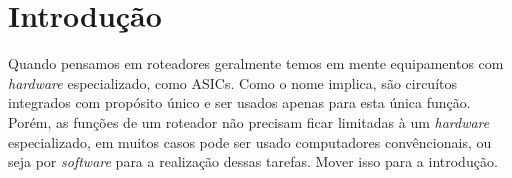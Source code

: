 \section{Introdução}

Quando pensamos em roteadores geralmente temos em mente equipamentos com \textit{hardware} especializado, como \acp{ASIC}. Como o nome implica, são circuítos integrados com propósito único e ser usados apenas para esta única função. Porém, as funções de um roteador não precisam ficar limitadas à um \textit{hardware} especializado, em muitos casos pode ser usado computadores convêncionais, ou seja por \textit{software} para a realização dessas tarefas. Mover isso para a introdução.
